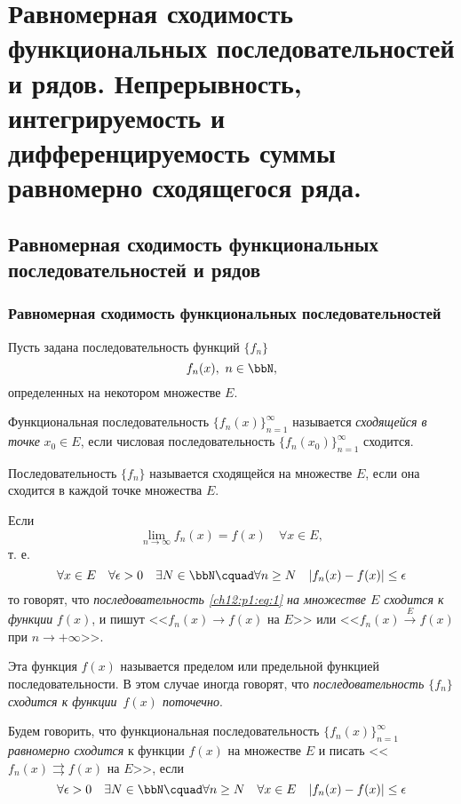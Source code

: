 \chapter{Равномерная сходимость функциональных последовательностей и рядов. Непрерывность, интегрируемость и дифференцируемость суммы равномерно сходящегося ряда.}

\section{Равномерная сходимость функциональных последовательностей и рядов}

\subsection{Равномерная сходимость функциональных последовательностей}

Пусть задана последовательность функций $\{f_n\}$
\begin{equation}
	\label{ch12:p1:eq:1}
	f_n(x),\ n\in \bbN,
\end{equation}
определенных на некотором множестве $E$.

\begin{defn}
	Функциональная последовательность $\{f_n(x)\}_{n=1}^\infty$ называется \textit{сходящейся в точке} $x_0 \in E$,
	если числовая последовательность $\{f_n(x_0)\}_{n=1}^\infty$ сходится.

	Последовательность $\{f_n\}$ называется сходящейся на множестве $E$, если она сходится в каждой точке множества $E$.

	Если
	$$
		\lim_{n \to \infty} f_n(x) = f(x)\quad \forall x\in E,
	$$
	т. е.
	\begin{equation}
		\label{ch12:p1:eq:2}
		\forall x \in E \quad \forall \epsilon > 0 \quad \exists N \in \bbN \cquad
			\forall n \ge N \quad |f_n(x) - f(x)| \le \epsilon
	\end{equation}
	то говорят, что \textit{последовательность \eqref{ch12:p1:eq:1} на множестве $E$ сходится к функции} $f(x)$,
	и пишут <<$f_n(x) \to f(x)$ на $E$>> или <<$f_n(x) \xrightarrow{E} f(x)$ при $n \to +\infty$>>.

	Эта функция $f(x)$ называется пределом или предельной функцией последовательности.
	В этом случае иногда говорят, что \textit{последовательность $\{f_n\}$ сходится к функции~$f(x)$ поточечно}.
\end{defn}

\begin{defn}
	Будем говорить, что функциональная последовательность $\{f_n(x)\}_{n=1}^\infty$ \textit{равномерно сходится} к функции $f(x)$
	на множестве $E$ и писать <<$f_n(x) \rightrightarrows f(x)$ на $E$>>, если
	\begin{equation}
		\label{ch12:p1:eq:3}
		\forall \epsilon > 0 \quad \exists N \in \bbN \cquad
			\forall n \ge N \quad \forall x \in E \quad |f_n(x) - f(x)| \le \epsilon
	\end{equation}
\end{defn}

